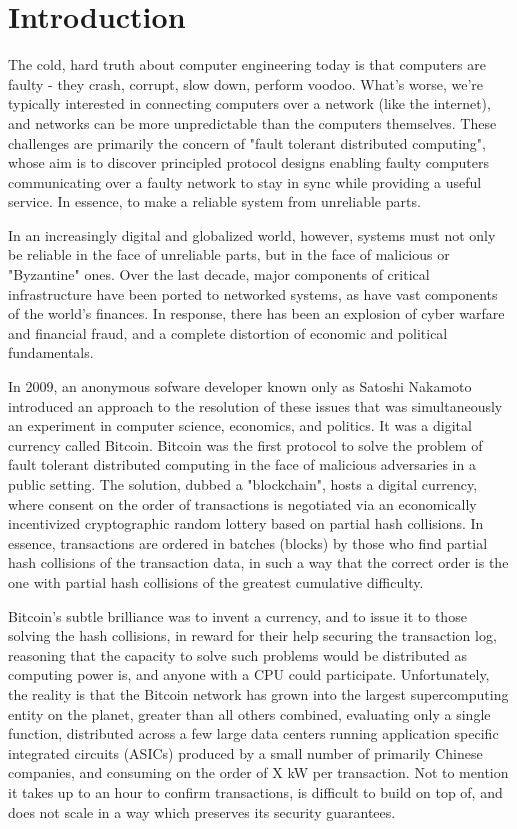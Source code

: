 \chapter{Introduction}
\label{ch:intro}

The cold, hard truth about computer engineering today is that computers are faulty - 
they crash, corrupt, slow down, perform voodoo. 
What's worse, we're typically interested in connecting computers over a network (like the internet),
and networks can be more unpredictable than the computers themselves.
These challenges are primarily the concern of "fault tolerant distributed computing",
whose aim is to discover principled protocol designs enabling faulty computers communicating over a faulty network 
to stay in sync while providing a useful service.
In essence, to make a reliable system from unreliable parts.

In an increasingly digital and globalized world, however, 
systems must not only be reliable in the face of unreliable parts, but in the face of malicious or "Byzantine" ones.
Over the last decade, major components of critical infrastructure have been ported to networked systems,
as have vast components of the world's finances.
In response, there has been an explosion of cyber warfare and financial fraud,
and a complete distortion of economic and political fundamentals.

In 2009, an anonymous sofware developer known only as Satoshi Nakamoto introduced an approach to the resolution of these issues 
that was simultaneously an experiment in computer science, economics, and politics. 
It was a digital currency called Bitcoin.
Bitcoin was the first protocol to solve the problem of fault tolerant distributed computing in the face of malicious adversaries in a public setting.
The solution, dubbed a "blockchain", hosts a digital currency, 
where consent on the order of transactions is negotiated via an economically incentivized cryptographic random lottery based on partial hash collisions.
In essence, transactions are ordered in batches (blocks) by those who find partial hash collisions of the transaction data, 
in such a way that the correct order is the one with partial hash collisions of the greatest cumulative difficulty.

Bitcoin's subtle brilliance was to invent a currency, and to issue it to those solving the hash collisions, in reward for their help securing the transaction log,
reasoning that the capacity to solve such problems would be distributed as computing power is, and anyone with a CPU could participate.
Unfortunately, the reality is that the Bitcoin network has grown into the largest supercomputing entity on the planet, greater than all others combined,
evaluating only a single function, distributed across a few large data centers running application specific integrated circuits (ASICs) produced by a small number of primarily Chinese companies, and consuming on the order of X kW per transaction.
Not to mention it takes up to an hour to confirm transactions, is difficult to build on top of, and does not scale in a way which preserves its security guarantees.

